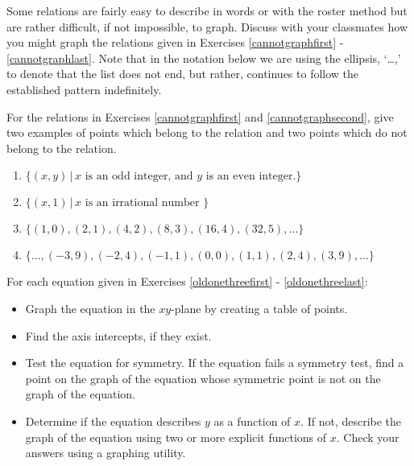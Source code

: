 Some relations are fairly easy to describe in words or with the roster method but are rather difficult, if not impossible, to graph. Discuss with your classmates how you might graph the relations given in Exercises \ref{cannotgraphfirst} - \ref{cannotgraphlast}.  Note that in the notation below we are using the ellipsis, `\ldots,' to denote that the list does not end, but rather, continues to follow the established pattern indefinitely.  

For the relations in Exercises \ref{cannotgraphfirst} and \ref{cannotgraphsecond}, give two examples of points which belong to the relation and two points which do not belong to the relation.


\begin{enumerate}
\setcounter{enumi}{\value{HW}}


\item $\{(x, y) \, | \, x \mbox{ is an odd integer, and } y \mbox{ is an even integer.}\}$ \label{cannotgraphfirst}
\item $\{(x, 1) \, | \, x \mbox{ is an irrational number }\}$ \label{cannotgraphsecond}
\item $\{(1, 0), (2, 1), (4, 2), (8, 3), (16, 4), (32, 5), \ldots \}$
\item $\{\ldots, (-3, 9), (-2, 4), (-1, 1), (0, 0), (1, 1), (2, 4), (3, 9), \ldots \}$ \label{cannotgraphlast}

\setcounter{HW}{\value{enumi}}
\end{enumerate}


For each equation given in Exercises \ref{oldonethreefirst} - \ref{oldonethreelast}:

\begin{itemize}

\item   Graph the equation in the $xy$-plane by creating a table of points. 

\item  Find the axis intercepts, if they exist.

\item  Test the equation for symmetry.  If the equation fails a symmetry test, find a point on the graph of the equation whose symmetric point is not on the graph of the equation.

\item  Determine if the equation describes $y$ as a function of $x$.  If not, describe the graph of the equation using two or more explicit functions of $x$.  Check your answers using a graphing utility.


\end{itemize}


